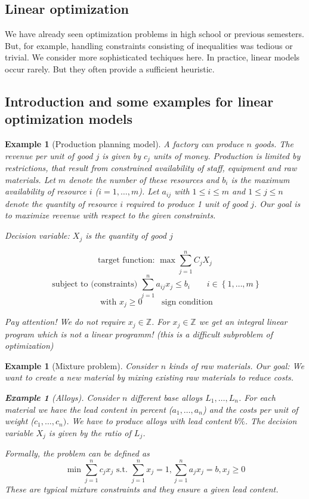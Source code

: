 \documentclass[a4paper]{article}
\numberwithin{lecref}{section}
\newcounter{exercises}
\newtheorem{example}[exercises]{Example}
\newtheorem*{Example}{Example}
\newcommand{\Set}[1]{\left\{#1\right\}}
\begin{document}
\subsection{Linear optimization}

We have already seen optimization problems in high school or previous semesters.
But, for example, handling constraints consisting of inequalities was tedious or trivial.
We consider more sophisticated techiques here.
In practice, linear models occur rarely. But they often provide a sufficient heuristic.

\subsection{Introduction and some examples for linear optimization models}

\begin{example}[Production planning model]
	\label{example:1}
	A factory can produce $n$ goods.
	The revenue per unit of good $j$ is given by $c_j$ units of money.
	Production is limited by restrictions, that result from constrained availability of staff, equipment and raw materials.
	Let $m$ denote the number of these resources and $b_i$ is the maximum availability of resource $i$ ($i = 1, \dots, m$).
	Let $a_{ij}$ with $1 \leq i \leq m$ and $1 \leq j \leq n$ denote the quantity of resource $i$ required to produce 1 unit of good $j$.
	Our goal is to maximize revenue with respect to the given constraints.

	\emph{Decision variable:} $X_j$ is the quantity of good $j$

	\[ \text{target function: } \max \sum_{j=1}^n C_j X_j \]
	\[ \text{ subject to (constraints) } \sum_{j=1}^n a_{ij} x_j \leq b_i \qquad i \in \Set{1, \dots, m} \]
	\[ \text{ with } x_j \geq 0 \qquad \text{ sign condition} \]

	Pay attention! We do not require $x_j \in \mathbb Z$. For $x_j \in \mathbb Z$ we get an integral linear program which is \emph{not} a linear programm! (this is a difficult subproblem of optimization)
\end{example}

\begin{example}[Mixture problem]
	\label{example:2}
	Consider $n$ kinds of raw materials. Our goal: We want to create a new material by mixing existing raw materials to reduce costs.

	\begin{Example}[Alloys]
		Consider $n$ different base alloys $L_1, \dots, L_n$.
		For each material we have the lead content in percent ($a_1, \dots, a_n$) and the costs per unit of weight ($c_1, \dots, c_n)$.
		We have to produce alloys with lead content $b \%$.
		The decision variable $X_j$ is given by the ratio of $L_j$.

		Formally, the problem can be defined as
		\[ \min{\sum_{j=1}^n c_j x_j} \text{ s.t. } \sum_{j=1}^n x_j = 1, \sum_{j=1}^n a_j x_j = b, x_j \geq 0 \]
		These are typical mixture constraints and they ensure a given lead content.
	\end{Example}
\end{example}
\end{document}
